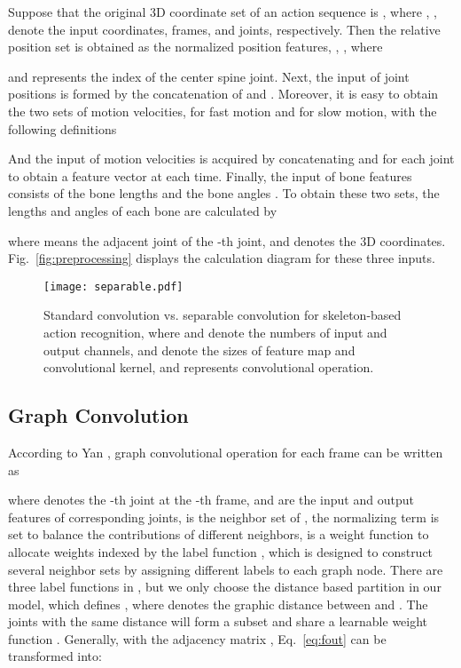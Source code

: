 \documentclass[10pt,journal,compsoc]{IEEEtran}
\begin{document}
Suppose that the original 3D coordinate set of an action sequence is , where , ,  denote the input coordinates, frames, and joints, respectively. Then the relative position set is obtained as the normalized position features, \ie, , where

and  represents the index of the center spine joint. Next, the input of joint positions is formed by the concatenation of  and . Moreover, it is easy to obtain the two sets of motion velocities,  for fast motion and  for slow motion, with the following definitions

And the input of motion velocities is acquired by concatenating  and  for each joint to obtain a feature vector at each time. Finally, the input of bone features consists of the bone lengths  and the bone angles . To obtain these two sets, the lengths and angles of each bone are calculated by

where  means the adjacent joint of the -th joint, and  denotes the 3D coordinates. Fig.~\ref{fig:preprocessing} displays the calculation diagram for these three inputs.

\begin{figure}[t]
  \vspace{-0.2cm}
  \centerline{\texttt{[image: separable.pdf]}}
  \vspace{-0.4cm}
  \caption{Standard convolution vs. separable convolution for skeleton-based action recognition, where  and  denote the numbers of input and output channels,  and  denote the sizes of feature map and convolutional kernel, and  represents convolutional operation.\bv}\label{fig:separable}
  \vspace{-0.4cm}
\end{figure}

\subsection{Graph Convolution}
\label{ssec:graphconv}

According to Yan \etal \cite{yan2018spatial}, graph convolutional operation for each frame  can be written as 

where  denotes the -th joint at the -th frame,  and  are the input and output features of corresponding joints,  is the neighbor set of , the normalizing term  is set to balance the contributions of different neighbors,  is a weight function to allocate weights indexed by the label function , which is designed to construct several neighbor sets  by assigning different labels to each graph node. There are three label functions in \cite{yan2018spatial}, but we only choose the distance based partition in our model, which defines , where  denotes the graphic distance between  and . The joints with the same distance will form a subset and share a learnable weight function . Generally, with the adjacency matrix , Eq.~\ref{eq:fout} can be transformed into:
\end{document}
